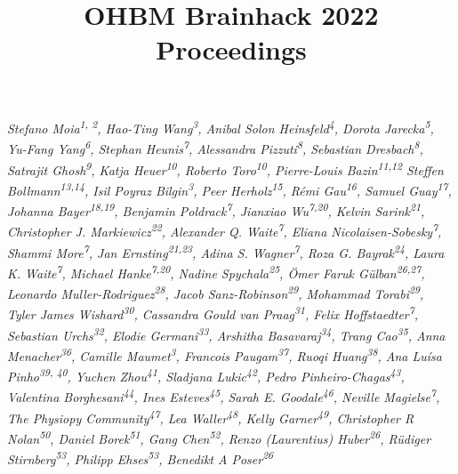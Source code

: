 \documentclass[10pt,a4paper,twocolumns]{proc}
\title{OHBM Brainhack 2022 Proceedings}
\newcommand{\authors}[1]{\emph{\footnotesize #1} \\}
\begin{document}
\maketitle

\authors{Stefano Moia\textsuperscript{1, 2}, %
Hao-Ting Wang\textsuperscript{3}, %
Anibal Solon Heinsfeld\textsuperscript{4}, %
Dorota Jarecka\textsuperscript{5}, %
Yu-Fang Yang\textsuperscript{6}, %
Stephan Heunis\textsuperscript{7}, %
Alessandra Pizzuti\textsuperscript{8}, %
Sebastian Dresbach\textsuperscript{8}, %
Satrajit Ghosh\textsuperscript{9}, %
Katja Heuer\textsuperscript{10}, %
Roberto Toro\textsuperscript{10}, %
Pierre-Louis Bazin\textsuperscript{11,12} %
Steffen Bollmann\textsuperscript{13,14}, %
Isil Poyraz Bilgin\textsuperscript{3}, %
Peer Herholz\textsuperscript{15}, %
Rémi Gau\textsuperscript{16}, %
Samuel Guay\textsuperscript{17}, %
Johanna Bayer\textsuperscript{18,19}, %
Benjamin Poldrack\textsuperscript{7}, %
Jianxiao Wu\textsuperscript{7,20}, %
Kelvin Sarink\textsuperscript{21}, %
Christopher J. Markiewicz\textsuperscript{22}, %
Alexander Q. Waite\textsuperscript{7}, %
Eliana Nicolaisen-Sobesky\textsuperscript{7}, %
Shammi More\textsuperscript{7}, %
Jan Ernsting\textsuperscript{21,23}, %
Adina S. Wagner\textsuperscript{7}, %
Roza G. Bayrak\textsuperscript{24}, %
Laura K. Waite\textsuperscript{7}, %
Michael Hanke\textsuperscript{7,20}, %
Nadine Spychala\textsuperscript{25}, %
\"Omer Faruk G\"ulban\textsuperscript{26,27}, %
Leonardo Muller-Rodriguez\textsuperscript{28}, %
Jacob Sanz-Robinson\textsuperscript{29}, %
Mohammad Torabi\textsuperscript{29}, %
Tyler James Wishard\textsuperscript{30}, %
Cassandra Gould van Praag\textsuperscript{31}, %
Felix Hoffstaedter\textsuperscript{7}, %
Sebastian Urchs\textsuperscript{32}, %
Elodie Germani\textsuperscript{33}, %
Arshitha Basavaraj\textsuperscript{34}, %
Trang Cao\textsuperscript{35}, %
Anna Menacher\textsuperscript{36}, %
Camille Maumet\textsuperscript{3}, %
Francois Paugam\textsuperscript{37}, %
Ruoqi Huang\textsuperscript{38}, %
Ana Luísa Pinho\textsuperscript{39, 40}, %
Yuchen Zhou\textsuperscript{41}, %
Sladjana Lukic\textsuperscript{42}, %
Pedro Pinheiro-Chagas\textsuperscript{43}, %
Valentina Borghesani\textsuperscript{44}, %
Ines Esteves\textsuperscript{45}, %
Sarah E. Goodale\textsuperscript{46}, %
Neville Magielse\textsuperscript{7}, %
The Physiopy Community\textsuperscript{47}, %
Lea Waller\textsuperscript{48}, %
Kelly Garner\textsuperscript{49}, %
Christopher R Nolan\textsuperscript{50}, %
Daniel Borek\textsuperscript{51}, %
Gang Chen\textsuperscript{52}, %
Renzo (Laurentius) Huber\textsuperscript{26}, %
R\"udiger Stirnberg\textsuperscript{53}, %
Philipp Ehses\textsuperscript{53}, %
Benedikt A Poser\textsuperscript{26}
}
\end{document}
